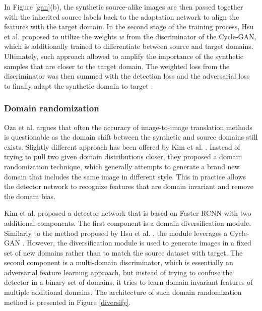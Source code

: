 \documentclass[english, 12pt, a4paper, elec, utf8, a-1b, online]{aaltothesis}
\begin{document}
In Figure \ref{gan}(b), the synthetic source-alike images are then passed together with the inherited source labels back to the adaptation network to align the features with the target domain. In the second stage of the training process, Hsu et al. proposed to utilize the weights $w$ from the discriminator of the Cycle-GAN, which is additionally trained to differentiate between source and target domains. Ultimately, such approach allowed to amplify the importance of the synthetic samples that are closer to the target domain. The weighted loss from the discriminator was then summed with the detection loss and the adversarial loss to finally adapt the synthetic domain to target \cite{Hsu2019}. 

\subsubsection{Domain randomization}

Oza et al. \cite{Oza2021} argues that often the accuracy of image-to-image translation methods is questionable as the domain shift between the synthetic and source domains still exists. Slightly different approach has been offered by Kim et al. \cite{Kim2019}. Instead of trying to pull two given domain distributions closer, they proposed a domain randomization technique, which generally attempts to generate a brand new domain that includes the same image in different style. This in practice allows the detector network to recognize features that are domain invariant and remove the domain bias. 

Kim et al. proposed a detector network that is based on Faster-RCNN with two additional components. The first component is a domain diversification module. Similarly to the method proposed by Hsu et al. \cite{Hsu2019}, the module leverages a Cycle-GAN \cite{Zhu2017}. However, the diversification module is used to generate images in a fixed set of new domains rather than to match the source dataset with target.  The second component is a multi-domain discriminator, which is essentially an adversarial feature learning approach, but instead of trying to confuse the detector in a binary set of domains, it tries to learn domain invariant features of multiple additional domains. The architecture of such domain randomization method is presented in Figure \ref{diversify}.
\end{document}

